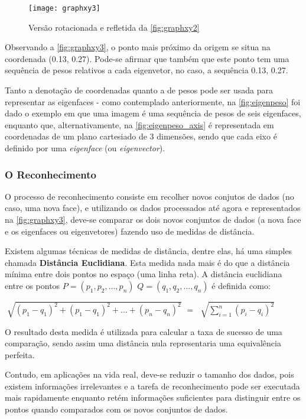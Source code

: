 \begin{figure}[h]
	\centering
	\texttt{[image: graphxy3]}
	\caption{Versão rotacionada e refletida da \autoref{fig:graphxy2}}
	\label{fig:graphxy3}
\end{figure}

Observando a \autoref{fig:graphxy3}, o ponto mais próximo da origem se situa na coordenada (0.13, 0.27). Pode-se afirmar que também que este ponto tem uma sequência de pesos relativos a cada eigenvetor, no caso, a sequência {0.13, 0.27}.

Tanto a denotação de coordenadas quanto a de pesos pode ser usada para representar as eigenfaces - como contemplado anteriormente, na \autoref{fig:eigenpeso} foi dado o exemplo em que uma imagem é uma sequência de pesos de seis eigenfaces, enquanto que, alternativamente, na  \autoref{fig:eigenpeso_axis} é representada em coordenadas de um plano cartesiado de 3 dimensões, sendo que cada eixo é definido por uma \textit{eigenface} (ou \textit{eigenvector}).

\subsubsection{O Reconhecimento}\label{subsec:reconhecimento}

O processo de reconhecimento consiste em recolher novos conjutos de dados (no caso, uma nova face), e utilizando os dados processados até agora e representados na \autoref{fig:graphxy3}, deve-se comparar os dois novos conjuntos de dados (a nova face e os eigenfaces ou eigenvetores) fazendo uso de medidas de distância. 

Existem algumas técnicas de medidas de distância, dentre elas, há uma simples chamada \textbf{Distância Euclidiana}. Esta medida nada mais é do que a distância mínima entre dois pontos no espaço (uma linha reta). A distância euclidiana entre os pontos $P = (p_1, p_2, ..., p_n)$ $Q = (q_1, q_2, ..., q_n)$ é definida como:

\begin{center}
	$\sqrt[]{(p_1 - q_1)^2 + (p_1 - q_1)^2 + ... + (p_n - q_n)^2}$ $=$ $\sqrt[]{ \sum_{i=1}^{n} (p_i - q_i)^2 }$ 
\end{center}

O resultado desta medida é utilizada para calcular a taxa de sucesso de uma comparação, sendo assim uma distância nula representaria uma equivalência perfeita.

Contudo, em aplicações na vida real, deve-se reduzir o tamanho dos dados, pois existem informações irrelevantes e a tarefa de reconhecimento pode ser executada mais rapidamente enquanto retém informações suficientes para distinguir entre os pontos quando comparados com os novos conjuntos de dados.

